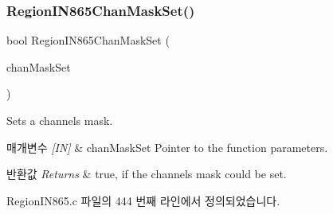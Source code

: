\subsubsection{\texorpdfstring{Region\+I\+N865\+Chan\+Mask\+Set()}{RegionIN865ChanMaskSet()}}
{\footnotesize\ttfamily bool Region\+I\+N865\+Chan\+Mask\+Set (\begin{DoxyParamCaption}\item[{\mbox{\hyperlink{group___r_e_g_i_o_n_ga6d24f7da136006410827dfb29f6b9b9e}{Chan\+Mask\+Set\+Params\+\_\+t}} $\ast$}]{chan\+Mask\+Set }\end{DoxyParamCaption})}



Sets a channels mask. 


\begin{DoxyParams}{매개변수}
{\em \mbox{[}\+I\+N\mbox{]}} & chan\+Mask\+Set Pointer to the function parameters.\\
\hline
\end{DoxyParams}

\begin{DoxyRetVals}{반환값}
{\em Returns} & true, if the channels mask could be set. \\
\hline
\end{DoxyRetVals}


Region\+I\+N865.\+c 파일의 444 번째 라인에서 정의되었습니다.


